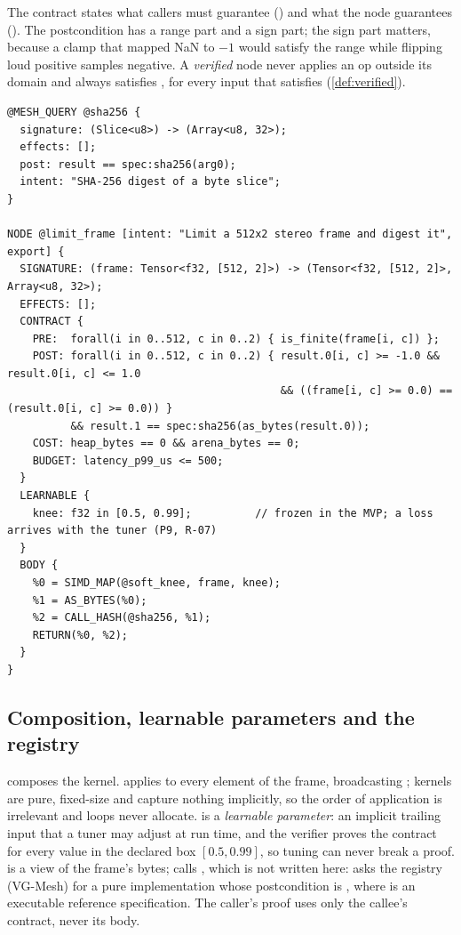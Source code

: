 The contract states what callers must guarantee () and what the node guarantees
(). The postcondition has a range part and a sign part; the sign part matters,
because a clamp that mapped NaN to $-1$ would satisfy the range while flipping loud positive
samples negative. A \emph{verified} node never applies an op outside its domain and always
satisfies , for every input that satisfies  (\cref{def:verified}).

\begin{lstlisting}[float=t,basicstyle=\ttfamily\scriptsize,caption={The exported frame node and the registry query it calls.},label=lst:frame]
@MESH_QUERY @sha256 {
  signature: (Slice<u8>) -> (Array<u8, 32>);
  effects: [];
  post: result == spec:sha256(arg0);
  intent: "SHA-256 digest of a byte slice";
}

NODE @limit_frame [intent: "Limit a 512x2 stereo frame and digest it", export] {
  SIGNATURE: (frame: Tensor<f32, [512, 2]>) -> (Tensor<f32, [512, 2]>, Array<u8, 32>);
  EFFECTS: [];
  CONTRACT {
    PRE:  forall(i in 0..512, c in 0..2) { is_finite(frame[i, c]) };
    POST: forall(i in 0..512, c in 0..2) { result.0[i, c] >= -1.0 && result.0[i, c] <= 1.0
                                           && ((frame[i, c] >= 0.0) == (result.0[i, c] >= 0.0)) }
          && result.1 == spec:sha256(as_bytes(result.0));
    COST: heap_bytes == 0 && arena_bytes == 0;
    BUDGET: latency_p99_us <= 500;
  }
  LEARNABLE {
    knee: f32 in [0.5, 0.99];          // frozen in the MVP; a loss arrives with the tuner (P9, R-07)
  }
  BODY {
    %0 = SIMD_MAP(@soft_knee, frame, knee);
    %1 = AS_BYTES(%0);
    %2 = CALL_HASH(@sha256, %1);
    RETURN(%0, %2);
  }
}
\end{lstlisting}

\subsection{Composition, learnable parameters and the registry}

 composes the kernel.  applies  to every element
of the frame, broadcasting ; kernels are pure, fixed-size and capture nothing
implicitly, so the order of application is irrelevant and loops never allocate.  is
a \emph{learnable parameter}: an implicit trailing input that a tuner may adjust at run time,
and the verifier proves the contract for every value in the declared box
$[0.5, 0.99]$, so tuning can never break a proof.  is a view of the frame's
bytes;  calls , which is not written here:  asks the
registry (VG-Mesh) for a pure implementation whose postcondition is
, where  is an executable reference
specification. The caller's proof uses only the callee's contract, never its body.

